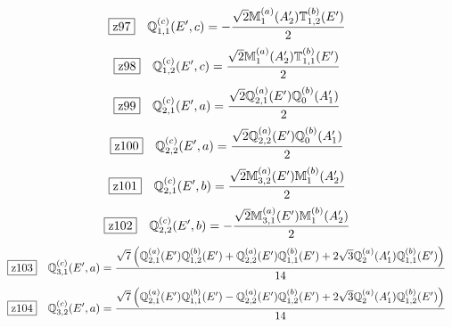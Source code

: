 \documentclass[fleqn,10pt,landscape]{jsarticle}
\begin{document}
\begin{dmath*}
\hspace*{3mm}\fbox{z97}\quad \mathbb{Q}_{1,1}^{(c)}(E^{\prime},c)=- \frac{\sqrt{2} \mathbb{M}_{1}^{(a)}(A_{2}^{\prime}) \mathbb{T}_{1,2}^{(b)}(E^{\prime})}{2}
\end{dmath*}
\begin{dmath*}
\hspace*{3mm}\fbox{z98}\quad \mathbb{Q}_{1,2}^{(c)}(E^{\prime},c)=\frac{\sqrt{2} \mathbb{M}_{1}^{(a)}(A_{2}^{\prime}) \mathbb{T}_{1,1}^{(b)}(E^{\prime})}{2}
\end{dmath*}
\begin{dmath*}
\hspace*{3mm}\fbox{z99}\quad \mathbb{Q}_{2,1}^{(c)}(E^{\prime},a)=\frac{\sqrt{2} \mathbb{Q}_{2,1}^{(a)}(E^{\prime}) \mathbb{Q}_{0}^{(b)}(A_{1}^{\prime})}{2}
\end{dmath*}
\begin{dmath*}
\hspace*{3mm}\fbox{z100}\quad \mathbb{Q}_{2,2}^{(c)}(E^{\prime},a)=\frac{\sqrt{2} \mathbb{Q}_{2,2}^{(a)}(E^{\prime}) \mathbb{Q}_{0}^{(b)}(A_{1}^{\prime})}{2}
\end{dmath*}
\begin{dmath*}
\hspace*{3mm}\fbox{z101}\quad \mathbb{Q}_{2,1}^{(c)}(E^{\prime},b)=\frac{\sqrt{2} \mathbb{M}_{3,2}^{(a)}(E^{\prime}) \mathbb{M}_{1}^{(b)}(A_{2}^{\prime})}{2}
\end{dmath*}
\begin{dmath*}
\hspace*{3mm}\fbox{z102}\quad \mathbb{Q}_{2,2}^{(c)}(E^{\prime},b)=- \frac{\sqrt{2} \mathbb{M}_{3,1}^{(a)}(E^{\prime}) \mathbb{M}_{1}^{(b)}(A_{2}^{\prime})}{2}
\end{dmath*}
\begin{dmath*}
\hspace*{3mm}\fbox{z103}\quad \mathbb{Q}_{3,1}^{(c)}(E^{\prime},a)=\frac{\sqrt{7} \left(\mathbb{Q}_{2,1}^{(a)}(E^{\prime}) \mathbb{Q}_{1,2}^{(b)}(E^{\prime}) + \mathbb{Q}_{2,2}^{(a)}(E^{\prime}) \mathbb{Q}_{1,1}^{(b)}(E^{\prime}) + 2 \sqrt{3} \mathbb{Q}_{2}^{(a)}(A_{1}^{\prime}) \mathbb{Q}_{1,1}^{(b)}(E^{\prime})\right)}{14}
\end{dmath*}
\begin{dmath*}
\hspace*{3mm}\fbox{z104}\quad \mathbb{Q}_{3,2}^{(c)}(E^{\prime},a)=\frac{\sqrt{7} \left(\mathbb{Q}_{2,1}^{(a)}(E^{\prime}) \mathbb{Q}_{1,1}^{(b)}(E^{\prime}) - \mathbb{Q}_{2,2}^{(a)}(E^{\prime}) \mathbb{Q}_{1,2}^{(b)}(E^{\prime}) + 2 \sqrt{3} \mathbb{Q}_{2}^{(a)}(A_{1}^{\prime}) \mathbb{Q}_{1,2}^{(b)}(E^{\prime})\right)}{14}
\end{dmath*}
\end{document}
